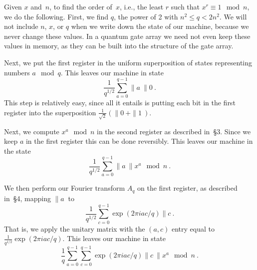 Given $x$ and~$n$, to find the order of~$x$, i.e., the least $r$ such 
that $x^r \equiv 1 \mod{n}$, we do the
following.  First, we find $q$, the power of 2 with $n^2 \leq q < 2 n^2$.  
We will not include $n$, $x$, or $q$ when we write down
the state of our machine, because we never change these values.
In a quantum gate array we need not even keep these values in
memory, as they can be built into the structure of the gate array.

Next, we put the first register
in the uniform superposition of states representing
numbers $a \mod{q}$.  This leaves our machine in state
\begin{equation}
\frac{1}{q^{1/2}} \sum_{a=0}^{q-1} \|a\>\|0\>.
\end{equation}
This step is relatively easy, since all it entails is putting each bit
in the first register into the superposition $\frac{1}{\sqrt{2}}(\|0\>
+\|1\>)$.

Next, we compute $x^a\mod{n}$ in the second register as described in~\S3.  
Since we keep $a$ in the first register
this can be done reversibly.  This leaves our machine in the state
\begin{equation}
\frac{1}{q^{1/2}} \sum_{a=0}^{q-1} \|a\>\|x^a\mod{n}\>.
\end{equation}

We then perform our Fourier transform $A_q$ on the first register,
as described in~\S4,
mapping $\|a\>$ to
\begin{equation}
\frac{1}{q^{1/2}} \sum_{c=0}^{q-1} \exp(2 \pi i ac/q) \|c\>.
\end{equation}
That is, we apply the unitary matrix
with the $(a,c)$ entry equal to $\frac{1}{q^{1/2}} \exp(2 \pi i ac/q)$.
 This leaves our machine in state
\begin{equation}
\frac{1}{q} \sum_{a=0}^{q-1} \sum_{c=0}^{q-1} 
\exp(2 \pi i ac / q) \|c\>\|x^a\mod{n}\>.
\end{equation}



